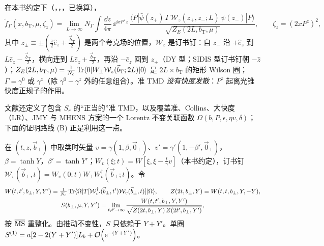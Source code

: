 \begin{definition}[准 TMD]\label{def:lamet-quasi-tmd}
在本书约定下（\cite{Ji:2019ewn}，\cite[第~3~节]{Liu:2022nnk}，\cite{Ebert:2022fmh}，已换算），
\begin{equation}\label{eq:lamet-quasi-tmd}
\tilde f_\Gamma(x,b_{\mathrm T},\mu,\zeta_z)=\lim_{L\to\infty}N_\Gamma\int\frac{\dd z}{4\pi}\,\ee^{\ii xP^zz}\,\frac{\langle P|\bar\psi(z_+)\,\Gamma\,\mathcal W_z(z_+,z_-;L)\,\psi(z_-)|P\rangle}{\sqrt{Z_E(2L,b_{\mathrm T},\mu)}},\qquad\zeta_z=(2xP^z)^2,
\end{equation}
其中 $z_\pm\equiv\pm(\frac z2\hat e_z+\frac{\vec b_{\mathrm T}}2)$ 是两个夸克场的位置，$\mathcal W_z$ 是订书钉：自 $z_-$ 沿 $+\hat e_z$ 到 $L\hat e_z-\frac{\vec b_{\mathrm T}}2$，横向连到 $L\hat e_z+\frac{\vec b_{\mathrm T}}2$，再沿 $-\hat e_z$ 回到 $z_+$（DY 型；SIDIS 型订书钉朝 $-\hat z$）；$Z_E(2L,b_{\mathrm T},\mu)=\frac1{N_c}\operatorname{Tr}\langle0|W_\perp\mathcal W_z(\vec b_{\mathrm T};2L)|0\rangle$ 是 $2L\times b_{\mathrm T}$ 的矩形 Wilson 圈；$\Gamma=\gamma^0$ 或 $\gamma^z$（除 $\gamma^0-\gamma^z$ 外的任意组合）。准 TMD \emph{没有快度发散}：$P^z$ 起离光锥快度正规子的作用。
\end{definition}

文献\cite{Ebert:2022fmh}还定义了包含 $S_r$ 的“正当的”准 TMD，以及覆盖准、Collins、大快度（LR）、JMY 与 MHENS 方案的一个 Lorentz 不变关联函数 $\Omega(b,P,\epsilon,\eta v,\delta)$；下面的证明路线 (B) 正是利用这一点。

\begin{definition}\label{def:lamet-soft-offlc}
在 $(t,z,\vec b_\perp)$ 中取类时矢量 $v=\gamma(1,\beta,\vec0_\perp)$、$v'=\gamma'(1,-\beta',\vec0_\perp)$，$\beta=\tanh Y$，$\beta'=\tanh Y'$；$W_v(\xi;t)=W[\xi,\xi-\frac t\gamma v]$（本书约定），订书钉 $\mathcal W_v(\vec b_\perp,t)=W_v(0;t)W_\perp W_v^\dagger(\vec b_\perp;t)$。令
\begin{equation}\label{eq:lamet-soft-offlc}
\begin{gathered}
W(t,t',b_\perp,Y,Y')=\tfrac1{N_c}\operatorname{Tr}\langle\Omega|T[\mathcal W^\dagger_{v'}(\vec b_\perp,t')\mathcal W_v(\vec b_\perp,t)]|\Omega\rangle,\qquad Z(2t,b_\perp,Y)=W(t,t,b_\perp,Y,-Y),\\
S(b_\perp,\mu,Y,Y')=\lim_{t,t'\to\infty}\frac{W(t,t',b_\perp,Y,Y')}{\sqrt{Z(2t,b_\perp,Y)\,Z(2t',b_\perp,Y')}},
\end{gathered}
\end{equation}
按 $\overline{\mathrm{MS}}$ 重整化。由推动不变性，$S$ 只依赖于 $Y+Y'$。单圈 $S^{(1)}=a[2-2(Y+Y')]L_b+\mathcal{O}\!\left(\mathrm{e}^{-(Y+Y')}\right)$。%
\end{definition}

